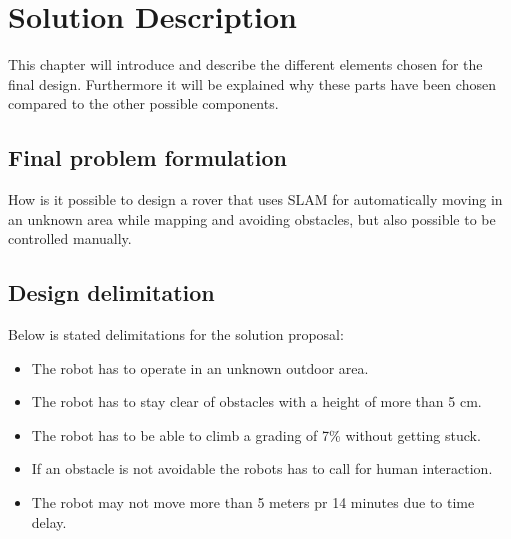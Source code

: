 \chapter{Solution Description}\label{ch:solutionDescription}

 

This chapter will introduce and describe the different elements chosen for the final design. Furthermore it will be explained why these parts have been chosen compared to the other possible components.

\section{Final problem formulation}\label{ch:finalproblem}

How is it possible to design a rover that uses SLAM for automatically moving in an unknown area while mapping and avoiding obstacles, but also possible to be controlled manually.



\section{Design delimitation}\label{ch:Designdelimitations}

Below is stated delimitations for the solution proposal:

\begin{itemize}
    \item The robot has to operate in an unknown outdoor area.
    \item The robot has to stay clear of obstacles with a height of more than 5 cm. 
    \item The robot has to be able to climb a grading of 7\% without getting stuck.
    \item If an obstacle is not avoidable the robots has to call for human interaction.
    \item The robot may not move more than 5 meters pr 14 minutes due to time delay.
\end{itemize}

